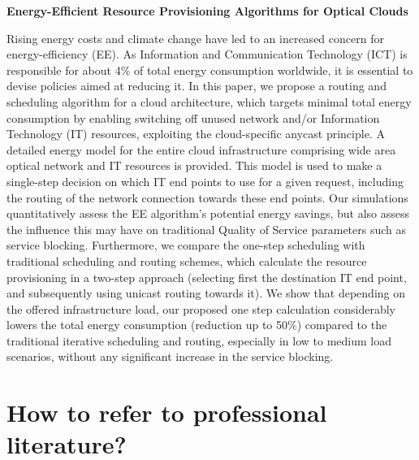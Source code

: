 \documentclass[aspectratio=169]{beamer}
\begin{document}
\begin{frame}[plain]
  
  \begin{center}
  \end{center}
  
  \scriptsize
  \textbf{Energy-Efficient Resource Provisioning Algorithms for Optical Clouds}
  
  \alert<1>{Rising energy costs and climate change have led to an increased concern for energy-efficiency (EE).} \alert<2>{As Information and Communication Technology (ICT) is responsible for about 4\% of total energy consumption worldwide, it is essential to devise policies aimed at reducing it.} \alert<3>{In this paper, we propose a routing and scheduling algorithm for a cloud architecture, which targets minimal total energy consumption by enabling switching off unused network and/or Information Technology (IT) resources, exploiting the cloud-specific anycast principle.} \alert<4>{A detailed energy model for the entire cloud infrastructure comprising wide area optical network and IT resources is provided. This model is used to make a single-step decision on which IT end points to use for a given request, including the routing of the network connection towards these end points. Our simulations quantitatively assess the EE algorithm’s potential energy savings, but also assess the influence this may have on traditional Quality of Service parameters such as service blocking. Furthermore, we compare the one-step scheduling with traditional scheduling and routing schemes, which calculate the resource provisioning in a two-step approach (selecting first the destination IT end point, and subsequently using unicast routing towards it).} \alert<5>{We show that depending on the offered infrastructure load, our proposed one step calculation considerably lowers the total energy consumption (reduction up to 50\%) compared to the traditional iterative scheduling and routing, especially in low to medium load scenarios, without any significant increase in the service blocking.}
  
\end{frame}

\section{How to refer to professional literature?}
\end{document}
